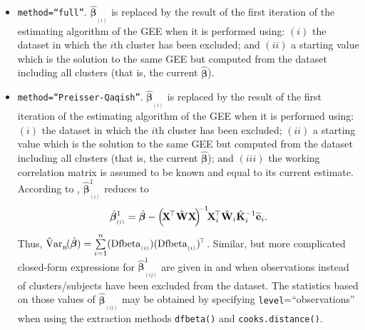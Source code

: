 \begin{itemize}
\item {\tt method=``full''}. $\hat{\bm{\beta}}_{_{(i)}}$ is replaced by the result of the first iteration of the
estimating algorithm of the GEE when it is performed using: $(i)$ the dataset in
which the $i$th cluster has been excluded; and $(ii)$ a starting value which is the solution
to the same GEE but computed from the dataset including all clusters (that is, the current $\hat{\bm{\beta}}$).

\item {\tt method=``Preisser-Qaqish''}. $\hat{\bm{\beta}}_{_{(i)}}$ is replaced by the result of the first iteration of the
es\-ti\-ma\-ting algorithm of the GEE when it is performed using: $(i)$ the dataset in
which the $i$th cluster has been excluded; $(ii)$ a starting value which is the solution
to the same GEE but computed from the dataset including all clusters (that is, the current $\hat{\bm{\beta}}$); and $(iii)$
the working correlation matrix is assumed to be known and equal to its current estimate.
According to \cite{PQ96,HP06}, $\hat{\bm{\beta}}_{_{(i)}}^{1}$ reduces to
$$\hat{\bm{\beta}}_{_{(i)}}^{1}=\hat{\bm{\beta}}-\left(\!{\bf X}^{\!\top}\hat{\bf W}{\bf X}\!\right)^{\!\!-1}\!\!{\bf X}_i^{\!\top}\hat{\bf W}_i\hat{\bf K}_i^{-1}\widetilde{\bf e}_i.$$
Thus, ${\rm \hat{V}ar}_{_{\rm B}}\!(\hat{\bm{\beta}})=\sum\limits_{i=1}^n ({\rm Dfbeta}_{_{(i)}})({\rm Dfbeta}_{_{(i)}})^{\!\top}$.
\noindent Similar, but more complicated closed-form expressions for $\hat{\bm{\beta}}_{_{(ij)}}^{1}$ are given in
\cite{PQ96} and \cite{HP06} when observations instead of clusters/subjects have been excluded from the dataset. The statistics based on those values of $\hat{\bm{\beta}}_{_{(ij)}}$ may be obtained by specifying {\tt level}=``observations'' when using the extraction methods 
{\tt dfbeta()} and {\tt cooks.distance()}.
\end{itemize}

